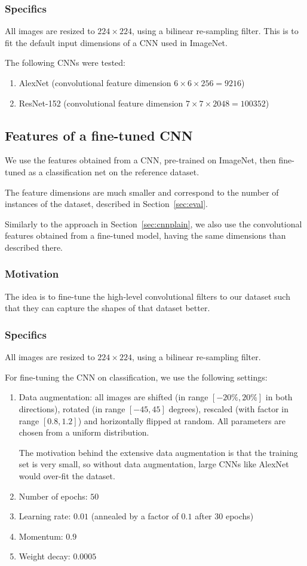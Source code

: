 \documentclass[fleqn]{article}
\begin{document}
\subsubsection{Specifics}
All images are resized to $224 \times 224$, using a bilinear
re-sampling filter. This is to fit the default input dimensions of
a CNN used in ImageNet.

The following CNNs were tested:
\begin{enumerate}
    \item AlexNet (convolutional feature dimension $6 \times 6 \times 256 = 9216$)
    \item ResNet-152 (convolutional feature dimension $7 \times 7 \times 2048 =100352$)
\end{enumerate}

\subsection{Features of a fine-tuned CNN}\label{sec:finetune}
We use the features obtained from a CNN, pre-trained on ImageNet,
then fine-tuned as a classification net on the reference dataset.

The feature dimensions are much smaller and correspond to the number
of instances of the dataset, described in Section~\ref{sec:eval}.

Similarly to the approach in Section~\ref{sec:cnnplain},
we also use the convolutional features obtained from a fine-tuned model,
having the same dimensions than described there.
\subsubsection{Motivation}
The idea is to fine-tune the high-level convolutional filters
to our dataset such that they can capture the shapes of that dataset better.
\subsubsection{Specifics}\label{sec:finetunespecs}
All images are resized to $224 \times 224$, using a bilinear
re-sampling filter.

For fine-tuning the CNN on classification, we use the following settings:
\begin{enumerate}
    \item Data augmentation: all images are shifted (in range $[-20\%, 20\%]$ in both directions), rotated (in range $[-45, 45]$ degrees), rescaled (with factor in range $[0.8, 1.2]$) and horizontally flipped at random.
    All parameters are chosen from a uniform distribution.

    The motivation behind the extensive data augmentation is that
    the training set is very small, so without data augmentation,
    large CNNs like AlexNet would over-fit the dataset.
    \item Number of epochs: $50$
    \item Learning rate: $0.01$ (annealed by a factor of $0.1$ after 30 epochs)
    \item Momentum: $0.9$
    \item Weight decay: $0.0005$
\end{enumerate}
\end{document}
